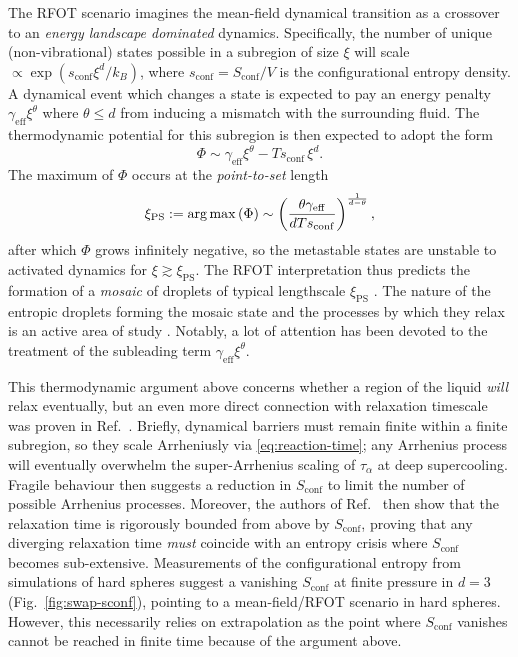 \documentclass[11pt,twoside]{report}
\begin{document}
The RFOT scenario imagines the mean-field dynamical transition as a crossover to an \emph{energy landscape dominated} dynamics.
Specifically, the number of unique (non-vibrational) states possible in a subregion of size $\xi$ will scale $\propto \exp{(s_\mathrm{conf} \xi^d / k_B)}$, where $s_\mathrm{conf} = S_\mathrm{conf} / V$ is the configurational entropy density.
A dynamical event which changes a state is expected to pay an energy penalty $\gamma_\mathrm{eff} \xi^\theta$ where $\theta \le d$ from inducing a mismatch with the surrounding fluid.
The thermodynamic potential for this subregion is then expected to adopt the form
\begin{equation}\label{eq:rfot-barrier}
  \Phi \sim \gamma_\mathrm{eff} \xi^\theta - T s_\mathrm{conf} \, \xi^d.
\end{equation}
The maximum of $\Phi$ occurs at the \emph{point-to-set}%
length
\begin{equation}\label{eq:rfot-xi}
  \xi_\mathrm{PS}
  := \operatorname*{arg\,max}{(\Phi)}
  \sim
  \left(
  \frac{\theta \gamma_\mathrm{eff}}{d T s_\mathrm{conf}}
  \right)^\frac{1}{d-\theta},
\end{equation}
after which $\Phi$ grows infinitely negative, so the metastable states are unstable to activated dynamics for $\xi \gtrsim \xi_\mathrm{PS}$.
The RFOT interpretation thus predicts the formation of a \emph{mosaic} of droplets of typical lengthscale $\xi_\mathrm{PS}$ \cite{KirkpatrickPRB1987,HallJCP1987,KirkpatrickPRA1989,BouchaudJCP2004}.
The nature of the entropic droplets forming the mosaic state and the processes by which they relax is an active area of study \cite{BouchaudJCP2004,DzeroPRB2005,FranzJSM2005,AngeliniJSP2017,RulquinJSM2016,BiroliMeanPRB2018,BiroliFinitePRB2018}.
Notably, a lot of attention has been devoted to the treatment of the subleading term $\gamma_\mathrm{eff} \xi^\theta$.

This thermodynamic argument above concerns whether a region of the liquid \emph{will} relax eventually, but an even more direct connection with relaxation timescale was proven in Ref.\ \cite{MontanariJSP2006}.
Briefly, dynamical barriers must remain finite within a finite subregion, so they scale Arrheniusly via \eqref{eq:reaction-time}; any Arrhenius process will eventually overwhelm the super-Arrhenius scaling of $\tau_\alpha$ at deep supercooling.
Fragile behaviour then suggests a reduction in $S_\mathrm{conf}$ to limit the number of possible Arrhenius processes.
Moreover, the authors of Ref.\ \cite{MontanariJSP2006} then show that the relaxation time is rigorously bounded from above by $S_\mathrm{conf}$, proving that any diverging relaxation time \emph{must} coincide with an entropy crisis where $S_\mathrm{conf}$ becomes sub-extensive.
Measurements of the configurational entropy from simulations of hard spheres suggest a vanishing $S_\mathrm{conf}$ at finite pressure in $d=3$ (Fig.\ \ref{fig:swap-sconf}), pointing to a mean-field/RFOT scenario in hard spheres.
However, this necessarily relies on extrapolation as the point where $S_\mathrm{conf}$ vanishes cannot be reached in finite time because of the argument above.
\end{document}
